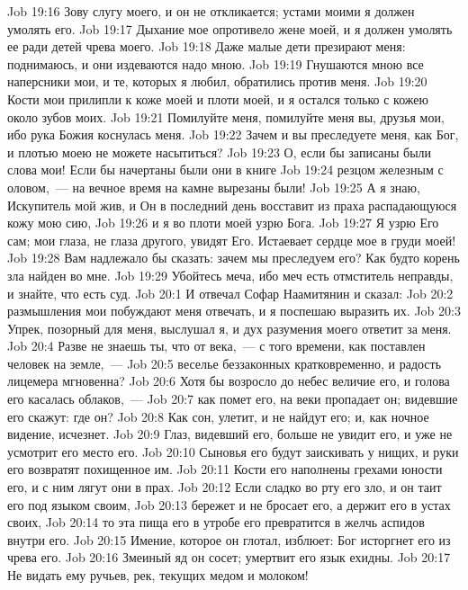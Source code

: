 \vs Job 19:16 Зову слугу моего, и он не откликается; устами моими я должен умолять его.
\vs Job 19:17 Дыхание мое опротивело жене моей, и я должен умолять ее ради детей чрева моего.
\vs Job 19:18 Даже малые дети презирают меня: поднимаюсь, и они издеваются надо мною.
\vs Job 19:19 Гнушаются мною все наперсники мои, и те, которых я любил, обратились против меня.
\vs Job 19:20 Кости мои прилипли к коже моей и плоти моей, и я остался только с кожею около зубов моих.
\vs Job 19:21 Помилуйте меня, помилуйте меня вы, друзья мои, ибо рука Божия коснулась меня.
\vs Job 19:22 Зачем и вы преследуете меня, как Бог, и плотью моею не можете насытиться?
\vs Job 19:23 О, если бы записаны были слова мои! Если бы начертаны были они в книге
\vs Job 19:24 резцом железным с оловом,~--- на вечное время на камне вырезаны были!
\vs Job 19:25 А я знаю, Искупитель мой жив, и Он в последний день восставит из праха распадающуюся кожу мою сию,
\vs Job 19:26 и я во плоти моей узрю Бога.
\vs Job 19:27 Я узрю Его сам; мои глаза, не глаза другого, увидят Его. Истаевает сердце мое в груди моей!
\vs Job 19:28 Вам надлежало бы сказать: зачем мы преследуем его? Как будто корень зла найден во мне.
\vs Job 19:29 Убойтесь меча, ибо меч есть отмститель неправды, и знайте, что есть суд.
\vs Job 20:1 И отвечал Софар Наамитянин и сказал:
\vs Job 20:2 размышления мои побуждают меня отвечать, и я поспешаю выразить их.
\vs Job 20:3 Упрек, позорный для меня, выслушал я, и дух разумения моего ответит за меня.
\vs Job 20:4 Разве не знаешь ты, что от века,~--- с того времени, как поставлен человек на земле,~---
\vs Job 20:5 веселье беззаконных кратковременно, и радость лицемера мгновенна?
\vs Job 20:6 Хотя бы возросло до небес величие его, и голова его касалась облаков,~---
\vs Job 20:7 как помет его, на веки пропадает он; видевшие его скажут: где он?
\vs Job 20:8 Как сон, улетит, и не найдут его; и, как ночное видение, исчезнет.
\vs Job 20:9 Глаз, видевший его, больше не увидит его, и уже не усмотрит его место его.
\vs Job 20:10 Сыновья его будут заискивать у нищих, и руки его возвратят похищенное им.
\vs Job 20:11 Кости его наполнены грехами юности его, и с ним лягут они в прах.
\vs Job 20:12 Если сладко во рту его зло, и он таит его под языком своим,
\vs Job 20:13 бережет и не бросает его, а держит его в устах своих,
\vs Job 20:14 то эта пища его в утробе его превратится в желчь аспидов внутри его.
\vs Job 20:15 Имение, которое он глотал, изблюет: Бог исторгнет его из чрева его.
\vs Job 20:16 Змеиный яд он сосет; умертвит его язык ехидны.
\vs Job 20:17 Не видать ему ручьев, рек, текущих медом и молоком!

